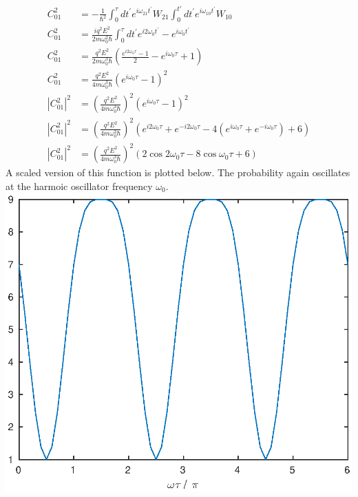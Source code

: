 \documentclass[a4paper,11pt]{article}
\numberwithin{equation}{section}
\begin{document}
\begin{align}
 C_{01}^2 &= -\frac{1}{\hbar^2}\int_0^\tau dt^\prime e^{i\omega_{21}t^\prime}W_{21}\int_0^{t\prime}dt^{\prime}e^{i\omega_{10}t^\prime}W_{10}\\
 C_{01}^2 &= \frac{iq^2E^2}{2m\omega_0^2\hbar}\int_0^\tau dt^\prime e^{i2\omega_0t^\prime}-e^{i\omega_0 t^\prime}\\
 C_{01}^2 &= \frac{q^2E^2}{2m\omega_0^3\hbar}\left(\frac{e^{i2\omega_0\tau}-1}{2}-e^{i\omega_0\tau}+1 \right)\\
 C_{01}^2 &= \frac{q^2E^2}{4m\omega_0^3\hbar}\left(e^{i\omega_0\tau}-1 \right)^2\\
 |C_{01}^2|^2 &= \left(\frac{q^2E^2}{4m\omega_0^3\hbar}\right)^2\left(e^{i\omega_0\tau}-1 \right)^2\\
 |C_{01}^2|^2 &= \left(\frac{q^2E^2}{4m\omega_0^3\hbar}\right)^2
		 \left(e^{i2\omega_0\tau}+e^{-i2\omega_0\tau}-4(e^{i\omega_0\tau}+e^{-i\omega_0\tau})+6 \right)\\
 |C_{01}^2|^2 &= \left(\frac{q^2E^2}{4m\omega_0^3\hbar}\right)^2 \left(2\cos{2\omega_0\tau}-8\cos{\omega_0\tau}+6\right)
\end{align}
A scaled version of this function is plotted below. The probability again oscillates at the harmoic oscillator frequency $\omega_0$.
\\
\includegraphics{p1_b}
\\
\end{document}
